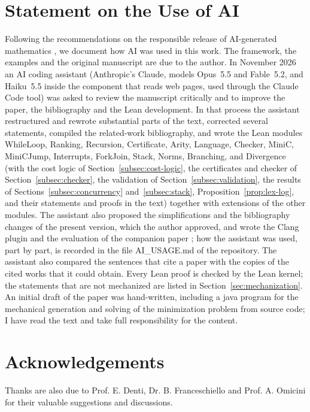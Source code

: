 \documentclass[oneside,english]{amsart}
\numberwithin{equation}{section}
\numberwithin{figure}{section}
\theoremstyle{plain}
\theoremstyle{definition}
\theoremstyle{plain}
\theoremstyle{remark}
\theoremstyle{plain}
\theoremstyle{definition}
\theoremstyle{plain}
\theoremstyle{remark}
\newcommand{\lean}[1]{{\ttfamily\small #1}}
\begin{document}
\section*{Statement on the Use of AI}

Following the recommendations on the responsible release of AI-generated mathematics \cite{agmai2026responsible}, we document how AI was used in this work. The framework, the examples and the original manuscript are due to the author. In November 2026 an AI coding assistant (Anthropic's Claude, models Opus~5.5 and Fable~5.2, and Haiku~5.5 inside the component that reads web pages, used through the Claude Code tool) was asked to review the manuscript critically and to improve the paper, the bibliography and the Lean development. In that process the assistant restructured and rewrote substantial parts of the text, corrected several statements, compiled the related-work bibliography, and wrote the Lean modules \lean{WhileLoop}, \lean{Ranking}, \lean{Recursion}, \lean{Certificate}, \lean{Arity}, \lean{Language}, \lean{Checker}, \lean{MiniC}, \lean{MiniCJump}, \lean{Interrupts}, \lean{ForkJoin}, \lean{Stack}, \lean{Norms}, \lean{Branching}, and \lean{Divergence} (with the cost logic of Section~\ref{subsec:cost-logic}, the certificates and checker of Section~\ref{subsec:checker}, the validation of Section~\ref{subsec:validation}, the results of Sections~\ref{subsec:concurrency} and~\ref{subsec:stack}, Proposition~\ref{prop:lex-log}, and their statements and proofs in the text) together with extensions of the other modules. The assistant also proposed the simplifications and the bibliography changes of the present version, which the author approved, and wrote the Clang plugin and the evaluation of the companion paper \cite{crosscheckTool}; how the assistant was used, part by part, is recorded in the file \lean{AI\_USAGE.md} of the repository. The assistant also compared the sentences that cite a paper with the copies of the cited works that it could obtain. Every Lean proof is checked by the Lean kernel; the statements that are not mechanized are listed in Section~\ref{sec:mechanization}. An initial draft of the paper was hand-written, including a java program for the mechanical generation and solving of the minimization problem from source code; I have read the text and take full responsibility for the content.

\section*{Acknowledgements}

Thanks are also due to Prof. E. Denti, Dr. B. Franceschiello and Prof.
A. Omicini for their valuable suggestions and discussions.



\end{document}
